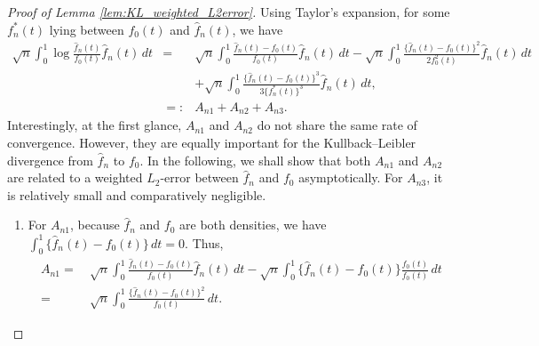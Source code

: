 \documentclass[12pt,letterpaper, twoside, openany]{article}
\theoremstyle{plain}
\begin{document}
\begin{proof}[Proof of Lemma \ref{lem:KL_weighted_L2error}]

Using Taylor's expansion, for some $f_n^*(t)$ lying between $f_0(t)$ and $\hat{f}_n(t)$, we have
\begin{eqnarray*}
	\sqrt{n}\int_0^1 \log \frac{\hat{f}_n(t)}{f_0(t)} \hat{f}_n(t)\,dt &=& \sqrt{n}\int_0^1 \frac{\hat{f}_n(t) - f_0(t)}{f_0(t)}\hat{f}_n(t)\,dt -\sqrt{n}\int_0^1\frac{\{\hat{f}_n(t) - f_0(t)\}^2}{2f_0^2(t)} \hat{f}_n(t)\,dt\\
	&& 	 + \sqrt{n}\int_0^1\frac{\{\hat{f}_n(t) - f_0(t)\}^3}{3\{f_n^*(t)\}^3} \hat{f}_n(t)\,dt, \\
	&=:& A_{n1} + A_{n2} + A_{n3}. 
\end{eqnarray*}
%	
Interestingly, at the first glance, $A_{n1}$ and $A_{n2}$ do not share the same rate of convergence.  
However, they are equally important for the Kullback--Leibler divergence from $\hat{f}_n$ to $f_0$. 
In the following, we shall show that both $A_{n1}$ and $A_{n2}$ are related to a weighted $L_2$-error between $\hat{f}_n$ and $f_0$ asymptotically. 
For $A_{n3}$, it is relatively small and comparatively negligible. 


\begin{enumerate}%
	\item [(i)]
	For $A_{n1}$, because $\hat{f}_n$ and $f_0$ are both densities, we have $\int_0^1 \{\hat{f}_n(t) - f_0(t) \}\,dt = 0$. Thus,
	\begin{align*}
		A_{n1} 
		=&~ \sqrt{n}\int_0^1 \frac{\hat{f}_n(t) - f_0(t)}{f_0(t)}\hat{f}_n(t)\,dt 
		- \sqrt{n}\int_0^1 \{ \hat{f}_n(t) - f_0(t) \} \frac{f_0(t)}{f_0(t)}\,dt\\
		=&~ \sqrt{n}\int_0^1 \frac{\{\hat{f}_n(t) - f_0(t)\}^2}{f_0(t)}\,dt.
	\end{align*}
	

\end{enumerate}
\end{proof}
\end{document}
